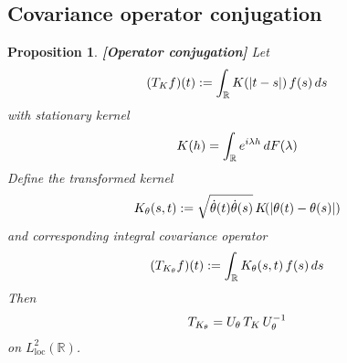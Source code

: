 \documentclass{article}
\newcommand{\assign}{:=}
\newcommand{\tmop}[1]{\ensuremath{\operatorname{#1}}}
\newcommand{\tmstrong}[1]{\textbf{#1}}
\newtheorem{proposition}{Proposition}
{\theorembodyfont{\rmfamily}\newtheorem{remark}{Remark}}
\begin{document}
\subsection{Covariance operator conjugation}

\begin{proposition}
  {\tmstrong{[Operator conjugation]\label{prop:conjugation}}} Let
  \begin{equation}
    (T_K f) (t) \assign \int_{\mathbb{R}} K (|t - s|)  \hspace{0.17em} f (s) 
    \hspace{0.17em} ds
  \end{equation}
  with stationary kernel
  \begin{equation}
    K (h) = \int_{\mathbb{R}} e^{i \lambda h}  \hspace{0.17em} dF (\lambda)
  \end{equation}
  Define the transformed kernel
  \begin{equation}
    K_{\theta} (s, t) \assign \sqrt{\dot{\theta} (t)  \dot{\theta} (s)} 
    \hspace{0.17em} K \hspace{-0.17em} (| \theta (t) - \theta (s) |)
  \end{equation}
  and corresponding integral covariance operator
  \begin{equation}
    (T_{K_{\theta}} f) (t) \assign \int_{\mathbb{R}} K_{\theta} (s, t) 
    \hspace{0.17em} f (s)  \hspace{0.17em} ds
  \end{equation}
  Then
  \begin{equation}
    T_{K_{\theta}} = U_{\theta}  \hspace{0.17em} T_K  \hspace{0.17em}
    U_{\theta}^{- 1}
  \end{equation}
  on $L^2_{\tmop{loc}} (\mathbb{R})$.
\end{proposition}
\end{document}
